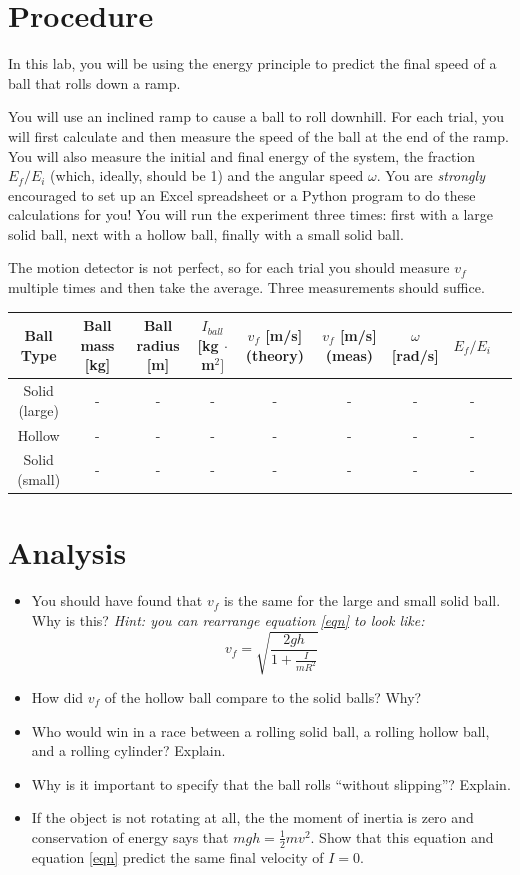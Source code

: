 \documentclass{article}
\begin{document}
\section*{Procedure}
In this lab, you will be using the energy principle to predict the final speed of a ball that rolls down a ramp. 

You will use an inclined ramp to cause a ball to roll downhill. For each trial, you will first calculate and then measure the speed of the ball at the end of the ramp. You will also measure the initial and final energy of the system, the
fraction $E_f/E_i$ (which, ideally, should be 1) and the angular speed $\omega$. You are \textit{strongly} encouraged to set up an Excel spreadsheet or a Python program to do these calculations for you! You will run the experiment three times: first with a large solid ball, next with a hollow ball, finally with a small solid ball.

The motion detector is not perfect, so for each trial you should measure $v_f$ multiple times and then take the average. Three measurements should suffice.


\begin{center}
	\begin{tabular}{|c|c|c|c|c|c|c|c|c|}
		\hline 
		Ball Type & Ball mass [kg] & Ball radius [m] & $I_{ball}$ [kg $\cdot$ m$^2]$&$v_f$ [m/s] (theory)&$v_f$ [m/s] (meas)& $\omega$ [rad/s]&$E_f/E_i$ \\\hline
		Solid (large) & - & - & - & - & - & - & - \\ \hline
		Hollow & - & - & - & - & - & - &-\\ \hline
		Solid (small) & - & - & - & - & - & - &-\\ \hline
	\end{tabular}
\end{center}
\section*{Analysis}
\begin{itemize}
	\item You should have found that $v_f$ is the same for the large and small solid ball. Why is this? \textit{Hint: you can rearrange equation \ref{eqn} to look like:}
	\begin{equation*}
		v_f=\sqrt{\frac{2gh}{1+\frac{I}{mR^2}}}
	\end{equation*}
	\item How did $v_f$ of the hollow ball compare to the solid balls? Why?
	\item Who would win in a race between a rolling solid ball, a rolling hollow ball, and a rolling cylinder? Explain.
	\item Why is it important to specify that the ball rolls ``without slipping''? Explain.
	\item If the object is not rotating at all, the the moment of inertia is zero and conservation of energy says that $mgh=\frac{1}{2}mv^2$. Show that this equation and equation \ref{eqn} predict the same final velocity of $I=0$.
\end{itemize}
\end{document}
